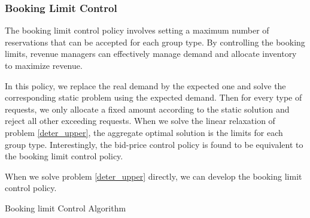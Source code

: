 \subsubsection*{Booking Limit Control}

The booking limit control policy involves setting a maximum number of reservations that can be accepted for each group type. By controlling the booking limits, revenue managers can effectively manage demand and allocate inventory to maximize revenue.

In this policy, we replace the real demand by the expected one and solve the corresponding static problem using the expected demand. Then for every type of requests, we only allocate a fixed amount according to the static solution and reject all other exceeding requests. When we solve the linear relaxation of problem \eqref{deter_upper}, the aggregate optimal solution is the limits for each group type. Interestingly, the bid-price control policy is found to be equivalent to the booking limit control policy.

When we solve problem \eqref{deter_upper} directly, we can develop the booking limit control policy.

\begin{algorithm}[H]
  \caption{Booking limit Control Algorithm}\label{algo_booking}
\end{algorithm}




